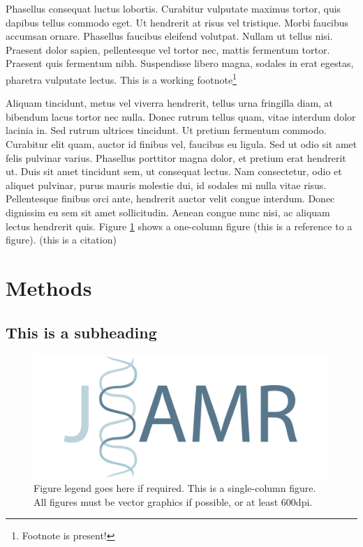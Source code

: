 \documentclass[paper=a4,fontsize=11pt,twocolumn]{article}
\begin{document}
Phasellus consequat luctus lobortis. Curabitur vulputate maximus tortor, quis dapibus tellus commodo eget. Ut hendrerit at risus vel tristique. Morbi faucibus accumsan ornare. Phasellus faucibus eleifend volutpat. Nullam ut tellus nisi. Praesent dolor sapien, pellentesque vel tortor nec, mattis fermentum tortor. Praesent quis fermentum nibh. Suspendisse libero magna, sodales in erat egestas, pharetra vulputate lectus. This is a working footnote\footnote{Footnote is present!}

Aliquam tincidunt, metus vel viverra hendrerit, tellus urna fringilla diam, at bibendum lacus tortor nec nulla. Donec rutrum tellus quam, vitae interdum dolor lacinia in. Sed rutrum ultrices tincidunt. Ut pretium fermentum commodo. Curabitur elit quam, auctor id finibus vel, faucibus eu ligula. Sed ut odio sit amet felis pulvinar varius. Phasellus porttitor magna dolor, et pretium erat hendrerit ut. Duis sit amet tincidunt sem, ut consequat lectus. Nam consectetur, odio et aliquet pulvinar, purus mauris molestie dui, id sodales mi nulla vitae risus. Pellentesque finibus orci ante, hendrerit auctor velit congue interdum. Donec dignissim eu sem sit amet sollicitudin. Aenean congue nunc nisi, ac aliquam lectus hendrerit quis.
Figure  \ref{fig:one-column} shows a one-column figure (this is a reference to a figure).
\cite{Buss2008} (this is a citation)

\section{Methods}
\label{methods}
\subsection{This is a subheading}

\begin{figure}
\centering
\includegraphics[width=\columnwidth]{logo-wide-jsamr.pdf}
\caption{Figure legend goes here if required. This is a single-column figure. All figures must be vector graphics if possible, or at least 600dpi.}
\label{fig:one-column}
\end{figure}
\end{document}
